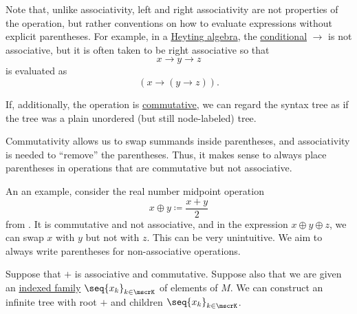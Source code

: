 \begin{remark}
\begin{thmenum}
    Note that, unlike associativity, left and right associativity are not properties of the operation, but rather conventions on how to evaluate expressions without explicit parentheses. For example, in a \hyperref[def:heyting_algebra]{Heyting algebra}, the \hyperref[eq:def:heyting_algebra/conditional]{conditional} \( \rightarrow \) is not associative, but it is often taken to be right associative so that
    \begin{equation*}
      x \rightarrow y \rightarrow z
    \end{equation*}
    is evaluated as
    \begin{equation*}
      (x \rightarrow (y \rightarrow z)).
    \end{equation*}

     If, additionally, the operation is \hyperref[def:binary_operation/commutative]{commutative}, we can regard the syntax tree as if the tree was a plain unordered (but still node-labeled) tree.

    Commutativity allows us to swap summands inside parentheses, and associativity is needed to \enquote{remove} the parentheses. Thus, it makes sense to always place parentheses in operations that are commutative but not associative.

    An an example, consider the real number midpoint operation
    \begin{equation*}
      x \oplus y \coloneqq \frac {x + y} 2
    \end{equation*}
    from . It is commutative and not associative, and in the expression \( x \oplus y \oplus z \), we can swap \( x \) with \( y \) but not with \( z \). This can be very unintuitive. We aim to always write parentheses for non-associative operations.

     Suppose that \( + \) is associative and commutative. Suppose also that we are given an \hyperref[def:cartesian_product/indexed_family]{indexed family} \( \seq{ x_k }_{k \in \mscrK} \) of elements of \( M \). We can construct an infinite tree with root \( + \) and children \( \seq{ x_k }_{k \in \mscrK} \).


\end{thmenum}
\end{remark}
